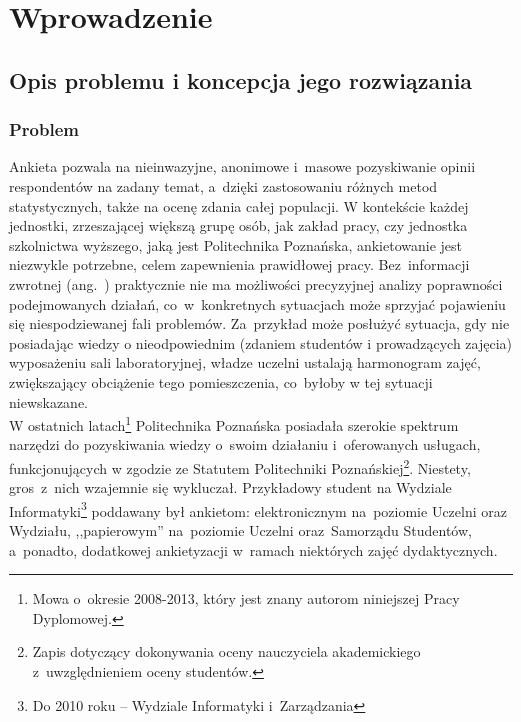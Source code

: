 \chapter{Wprowadzenie}
\label{Chapter1}

\section{Opis problemu i koncepcja jego rozwiązania}
\label{Chapter11}

\subsection{Problem}
\label{Chapter111}

Ankieta pozwala na nieinwazyjne, anonimowe i~masowe pozyskiwanie opinii respondentów na zadany temat, a~dzięki zastosowaniu różnych metod statystycznych, także na ocenę zdania całej populacji. W kontekście każdej jednostki, zrzeszającej większą grupę osób, jak zakład pracy, czy jednostka szkolnictwa wyższego, jaką jest Politechnika Poznańska, ankietowanie jest niezwykle potrzebne, celem zapewnienia prawidłowej pracy. Bez~informacji zwrotnej (ang.~) praktycznie nie ma możliwości precyzyjnej analizy poprawności podejmowanych działań, co~w~konkretnych sytuacjach może sprzyjać pojawieniu się niespodziewanej fali problemów. Za~przykład może posłużyć sytuacja, gdy nie posiadając wiedzy o nieodpowiednim (zdaniem studentów i prowadzących zajęcia) wyposażeniu sali laboratoryjnej, władze uczelni ustalają harmonogram zajęć, zwiększający obciążenie tego pomieszczenia, co~byłoby w tej sytuacji niewskazane. \\

W ostatnich latach\footnote{Mowa o~okresie 2008-2013, który jest znany autorom niniejszej Pracy Dyplomowej.} Politechnika Poznańska posiadała szerokie spektrum narzędzi do pozyskiwania wiedzy o~swoim działaniu i~oferowanych usługach, funkcjonujących w zgodzie ze Statutem Politechniki Poznańskiej\footnote{Zapis dotyczący dokonywania oceny nauczyciela akademickiego z~uwzględnieniem oceny studentów\cite{AP:SPP11}.}. Niestety, gros~z~nich wzajemnie się wykluczał. Przykładowy student na Wydziale Informatyki\footnote{Do 2010 roku -- Wydziale Informatyki i~Zarządzania} poddawany był ankietom: elektronicznym na~poziomie Uczelni oraz Wydziału, ,,papierowym'' na~poziomie Uczelni oraz~Samorządu Studentów, a~ponadto, dodatkowej ankietyzacji w~ramach niektórych zajęć dydaktycznych. \\

